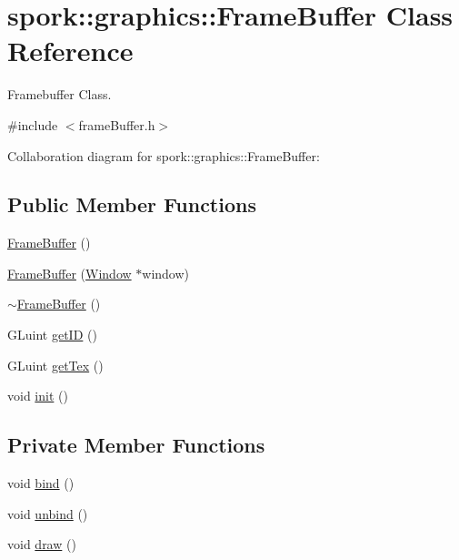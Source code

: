 \hypertarget{classspork_1_1graphics_1_1_frame_buffer}{}\section{spork\+:\+:graphics\+:\+:Frame\+Buffer Class Reference}
\label{classspork_1_1graphics_1_1_frame_buffer}


Framebuffer Class.  




{\ttfamily \#include $<$frame\+Buffer.\+h$>$}



Collaboration diagram for spork\+:\+:graphics\+:\+:Frame\+Buffer\+:
\subsection*{Public Member Functions}
\begin{DoxyCompactItemize}
\item 
\hyperlink{classspork_1_1graphics_1_1_frame_buffer_abbfe4ea72dabd467d5166daa1ce02178}{Frame\+Buffer} ()
\item 
\hyperlink{classspork_1_1graphics_1_1_frame_buffer_a4c07c51b63295d3d47931e46eb6d3b31}{Frame\+Buffer} (\hyperlink{classspork_1_1graphics_1_1_window}{Window} $\ast$window)
\item 
\hyperlink{classspork_1_1graphics_1_1_frame_buffer_af0187f7d1b13fc0dd761f4207b9555c4}{$\sim$\+Frame\+Buffer} ()
\item 
G\+Luint \hyperlink{classspork_1_1graphics_1_1_frame_buffer_a4544b8c2ffe1ea1a248750c0b3c87f57}{get\+ID} ()
\item 
G\+Luint \hyperlink{classspork_1_1graphics_1_1_frame_buffer_a2c3884a0af7357158990dd6c2c2f9be0}{get\+Tex} ()
\item 
void \hyperlink{classspork_1_1graphics_1_1_frame_buffer_a51a82de6f2015491e210b352360eb1b0}{init} ()
\end{DoxyCompactItemize}
\subsection*{Private Member Functions}
\begin{DoxyCompactItemize}
\item 
void \hyperlink{classspork_1_1graphics_1_1_frame_buffer_aff6d38e7e34bede17c72de375ca613cd}{bind} ()
\item 
void \hyperlink{classspork_1_1graphics_1_1_frame_buffer_a844acfa32ed547f63e5e42d57218a633}{unbind} ()
\item 
void \hyperlink{classspork_1_1graphics_1_1_frame_buffer_a98e8ac4671cc62e09bba3ceff5c36adc}{draw} ()
\end{DoxyCompactItemize}
